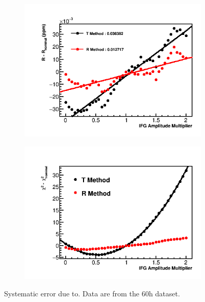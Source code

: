 \begin{figure}[h]
\centering
    \begin{subfigure}[t]{0.45\textwidth}
        \centering
        \includegraphics[width=\textwidth]{IFG_Amplitude_Compare_R}
        \caption{}
    \end{subfigure}%
    \hspace{1cm}
    \begin{subfigure}[t]{0.45\textwidth}
        \centering
        \includegraphics[width=\textwidth]{IFG_Amplitude_Compare_Chisq.png}
        \caption{}
    \end{subfigure}
\caption[Systematic error due to]{Systematic error due to. Data are from the 60h dataset.}
\label{fig:IFGAmpscan}
\end{figure}




